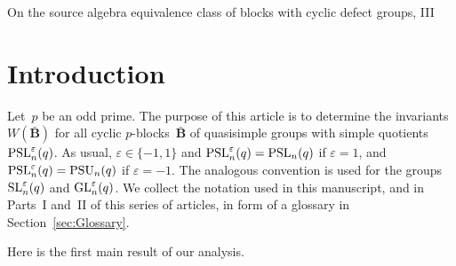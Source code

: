\documentclass[12pt]{amsart}
\newcommand{\bB}{{\mathbf{B}}}
\def\GL{ \text{\rm GL} }
\def\SL{ \text{\rm SL} }
\def\PSL{ \text{\rm PSL} }
\def\PSU{ \text{\rm PSU} }
\theoremstyle{theorem}
\theoremstyle{definition}
\theoremstyle{remark}
\begin{document}

\pagestyle{myheadings}
{On the source algebra equivalence class of blocks with cyclic defect groups, III}



\vspace{6mm}

\section{Introduction}\label{sec:Intro}%
Let~$p$ be an odd prime.  
The purpose of this article is to determine the 
invariants $W( \bar{\bB} )$ for all cyclic $p$-blocks~$\bar{\bB}$  of quasisimple 
groups with simple quotients~$\PSL_n^{\varepsilon}(q)$. As usual, 
$\varepsilon \in \{ -1, 1 \}$ and $\PSL_n^{\varepsilon}(q) = \PSL_n( q )$ 
if $\varepsilon = 1$, and $\PSL_n^{\varepsilon}(q) = \PSU_n( q )$
if $\varepsilon = -1$. The analogous convention is used for the groups
$\SL_n^{\varepsilon}(q)$ and $\GL_n^{\varepsilon}(q)$.
%
We collect the notation used in this manuscript, and in Parts~{I}
and~{II} of this series of articles, in form of a glossary in 
Section~\ref{sec:Glossary}.
%

Here is the first main result of our analysis.
\end{document}
